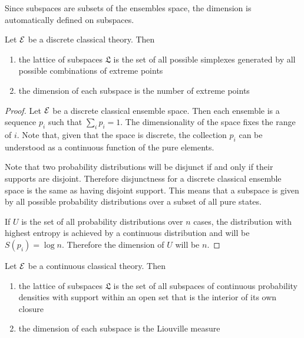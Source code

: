 \begin{remark}
	Since subspaces are subsets of the ensembles space, the dimension is automatically defined on subspaces.
\end{remark}


\begin{conj}
	Let $\mathcal{E}$ be a discrete classical theory. Then
	\begin{enumerate}
		\item the lattice of subspaces $\mathfrak{L}$ is the set of all possible simplexes generated by all possible combinations of extreme points
		\item the dimension of each subspace is the number of extreme points
	\end{enumerate}
\end{conj}

\begin{proof}
	Let $\mathcal{E}$ be a discrete classical ensemble space. Then each ensemble is a sequence $p_i$ such that $\sum_i p_i = 1$. The dimensionality of the space fixes the range of $i$. Note that, given that the space is discrete, the collection $p_i$ can be understood as a continuous function of the pure elements.
	
	Note that two probability distributions will be disjunct if and only if their supports are disjoint. Therefore disjunctness for a discrete classical ensemble space is the same as having disjoint support. This means that a subspace is given by all possible probability distributions over a subset of all pure states.
	
	If $U$ is the set of all probability distributions over $n$ cases, the distribution with highest entropy is achieved by a continuous distribution and will be $S(p_i) = \log n$. Therefore the dimension of $U$ will be $n$.
\end{proof}

\begin{conj}
	Let $\mathcal{E}$ be a continuous classical theory. Then
	\begin{enumerate}
		\item the lattice of subspaces $\mathfrak{L}$ is the set of all subspaces of continuous probability densities with support within an open set that is the interior of its own closure
		\item the dimension of each subspace is the Liouville measure
	\end{enumerate}
\end{conj}

